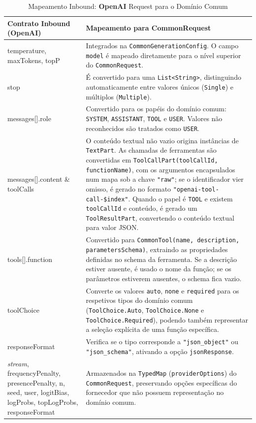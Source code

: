 \begin{table}[H]
    \centering
    \footnotesize
    \renewcommand{\arraystretch}{1.25}
    \begin{tabularx}{\textwidth}{|>{\ttfamily\raggedright\arraybackslash}p{4cm}|Y|}
        \hline
        \textbf{Contrato Inbound (OpenAI)} & \textbf{Mapeamento para CommonRequest} \\
        \hline
        temperature, maxTokens, topP &
        Integrados na \texttt{CommonGenerationConfig}. O campo \texttt{model} é mapeado diretamente para o nível superior do \texttt{CommonRequest}. \\
        \hline
        stop &
        É convertido para uma \texttt{List<String>}, distinguindo automaticamente entre valores únicos (\texttt{Single}) e múltiplos (\texttt{Multiple}). \\
        \hline
        messages[].role &
        Convertido para os papéis do domínio comum: \texttt{SYSTEM}, \texttt{ASSISTANT}, \texttt{TOOL} e \texttt{USER}. Valores não reconhecidos são tratados como \texttt{USER}. \\
        \hline
        messages[].content \& toolCalls &
        O conteúdo textual não vazio origina instâncias de \texttt{TextPart}. As chamadas de ferramentas são convertidas em \texttt{ToolCallPart(toolCallId, functionName)}, com os argumentos encapsulados num mapa sob a chave \texttt{"raw"}; se o identificador vier omisso, é gerado no formato \texttt{"openai-tool-call-\$index"}. Quando o papel é \texttt{TOOL} e existem \texttt{toolCallId} e conteúdo, é gerado um \texttt{ToolResultPart}, convertendo o conteúdo textual para valor JSON. \\
        \hline
        tools[].function &
        Convertido para \texttt{CommonTool(name, description, parametersSchema)}, extraindo as propriedades definidas no schema da ferramenta. Se a descrição estiver ausente, é usado o nome da função; se os parâmetros estiverem ausentes, o schema fica vazio. \\
        \hline
        toolChoice &
        Converte os valores \texttt{auto}, \texttt{none} e \texttt{required} para os respetivos tipos do domínio comum (\texttt{ToolChoice.Auto}, \texttt{ToolChoice.None} e \texttt{ToolChoice.Required}), podendo também representar a seleção explícita de uma função específica. \\
        \hline
        responseFormat &
        Verifica se o tipo corresponde a \texttt{"json\_object"} ou \texttt{"json\_schema"}, ativando a opção \texttt{jsonResponse}. \\
        \hline
        \textit{stream}, frequencyPenalty, presencePenalty, n, seed, user, logitBias, logProbs, topLogProbs, responseFormat &
        Armazenados na \texttt{TypedMap} (\texttt{providerOptions}) do \texttt{CommonRequest}, preservando opções específicas do fornecedor que não possuem representação no domínio comum. \\
        \hline
    \end{tabularx}
    \caption{Mapeamento Inbound: \textbf{OpenAI} Request para o Domínio Comum}
    \label{tab:openai-inbound-mapping}
\end{table}


